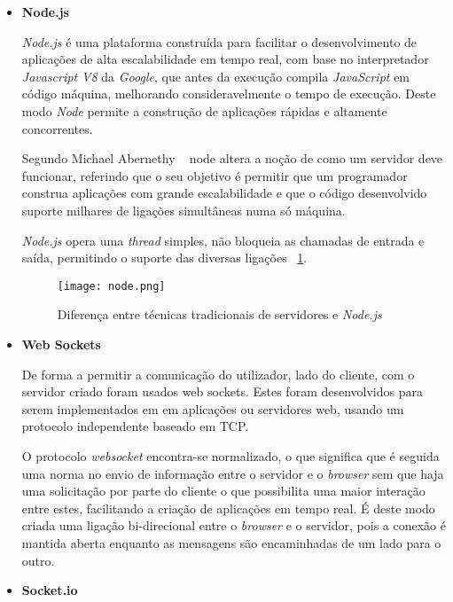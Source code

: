 \begin{itemize}

\item \textbf{Node.js}


\textit{Node.js} é uma plataforma construída para facilitar o desenvolvimento de aplicações de alta escalabilidade em tempo real, com base no interpretador \textit{Javascript V8} da \textit{Google}, que antes da execução compila \textit{JavaScript} em código máquina, melhorando consideravelmente o tempo de execução. Deste modo \textit{Node} permite a construção de aplicações rápidas e altamente concorrentes.

Segundo Michael Abernethy ~\cite{Abernethy2011} node altera a noção de como um servidor deve funcionar, referindo que o seu objetivo é permitir que um programador construa aplicações com grande escalabilidade e que o código desenvolvido suporte milhares de ligações simultâneas numa só máquina. 

\textit{Node.js} opera uma \textit{thread} simples, não bloqueia as chamadas de entrada e saída, permitindo o suporte das diversas ligações ~\ref{fig:node}.

\begin{figure}[ht]
\centering
\texttt{[image: node.png]}
\caption[\textit{Node.js}] {Diferença entre técnicas tradicionais de servidores e \textit{Node.js}\protect\footnotemark}
\label{fig:node}
\end{figure}


\item \textbf{Web Sockets}

De forma a permitir a comunicação do utilizador, lado do cliente, com o servidor criado foram usados web sockets. Estes foram desenvolvidos para serem implementados em em aplicações ou servidores web, usando um protocolo independente baseado em TCP.

O protocolo \textit{websocket} encontra-se normalizado, o que significa que é seguida uma norma no envio de informação entre o servidor e o \textit{browser} sem que haja uma solicitação por parte do cliente o que possibilita uma maior interação entre estes, facilitando a criação de aplicações em tempo real. É deste modo criada uma ligação bi-direcional entre o \textit{browser} e o servidor, pois a conexão é mantida aberta enquanto as mensagens são encaminhadas de um lado para o outro.


\item \textbf{Socket.io}


\end{itemize}
